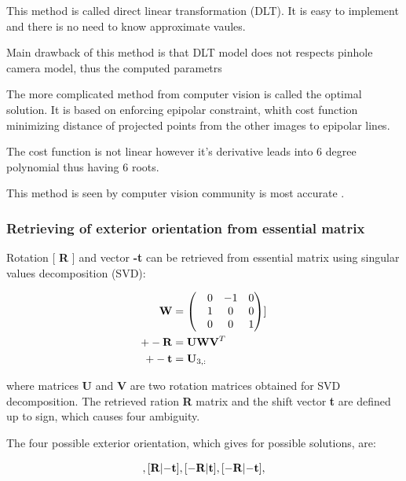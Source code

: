 \documentclass[a4paper,12pt]{article}
\newcommand{\ematr}[1]{
{\bf #1}
}
\newcommand{\evect}[1]{
{\bf #1}
}
\begin{document}
This method is called direct linear transformation (DLT). It is easy to implement and 
there is no need to know approximate vaules. 

Main drawback of this method is that DLT model does not respects pinhole camera model, thus
the computed parametrs 

The more complicated method from computer vision is called the optimal solution. 
It is based on enforcing epipolar constraint, whith cost function 
minimizing distance of projected points from the other images to epipolar lines.

The cost function is not linear however it's derivative leads into 6 degree polynomial thus 
having 6 roots.

This method is seen by computer vision community is most accurate \cite[p. 315]{Hartley2004}.  

\subsubsection{Retrieving of exterior orientation from essential matrix}
\label{sec:ess_eo}


Rotation [\ematr{R}] and vector \evect{-t} can be retrieved from essential matrix using 
singular values decomposition (SVD):

\begin{equation}
\begin{split}
\ematr{W} &=
\begin{pmatrix}
& 0 & -1 & 0 \\
& 1 & 0 & 0 \\
& 0 & 0 & 1\\
\end{pmatrix}] \\
+- \ematr{R} &= \ematr{U}  \ematr{W} \ematr{V}^{T}\\
+- \evect{t} &= \evect{U}_{3,:}
\end{split}
\end{equation}

where matrices \ematr{U} and \ematr{V} are two rotation matrices  obtained for SVD decomposition.
The retrieved ration \ematr{R} matrix and the shift vector \evect{t} are defined up to sign,
which causes four ambiguity. 

The four possible exterior orientation, which gives for possible solutions, are:

\begin{equation}
[\ematr{R}|\evect{t}],
[\ematr{R}|\evect{-t}],
[\ematr{-R}|\evect{t}],
[\ematr{-R}|\evect{-t}],
\end{equation}
\end{document}
